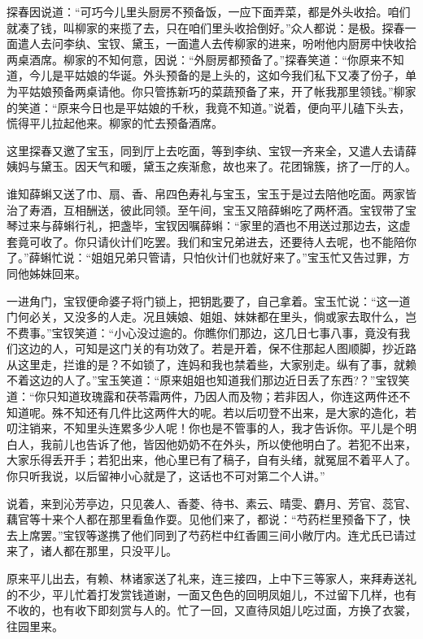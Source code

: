 \documentclass[12pt,oneside]{book}
\begin{document}
探春因说道：“可巧今儿里头厨房不预备饭，一应下面弄菜，都是外头收拾。咱们就凑了钱，叫柳家的来揽了去，只在咱们里头收拾倒好。”众人都说：是极。探春一面遣人去问李纨、宝钗、黛玉，一面遣人去传柳家的进来，吩咐他内厨房中快收拾两桌酒席。柳家的不知何意，因说：“外厨房都预备了。”探春笑道：“你原来不知道，今儿是平姑娘的华诞。外头预备的是上头的，这如今我们私下又凑了份子，单为平姑娘预备两桌请他。你只管拣新巧的菜蔬预备了来，开了帐我那里领钱。”柳家的笑道：“原来今日也是平姑娘的千秋，我竟不知道。”说着，便向平儿磕下头去，慌得平儿拉起他来。柳家的忙去预备酒席。

这里探春又邀了宝玉，同到厅上去吃面，等到李纨、宝钗一齐来全，又遣人去请薛姨妈与黛玉。因天气和暖，黛玉之疾渐愈，故也来了。花团锦簇，挤了一厅的人。

谁知薛蝌又送了巾、扇、香、帛四色寿礼与宝玉，宝玉于是过去陪他吃面。两家皆治了寿酒，互相酬送，彼此同领。至午间，宝玉又陪薛蝌吃了两杯酒。宝钗带了宝琴过来与薛蝌行礼，把盏毕，宝钗因嘱薛蝌：“家里的酒也不用送过那边去，这虚套竟可收了。你只请伙计们吃罢。我们和宝兄弟进去，还要待人去呢，也不能陪你了。”薛蝌忙说：“姐姐兄弟只管请，只怕伙计们也就好来了。”宝玉忙又告过罪，方同他姊妹回来。

一进角门，宝钗便命婆子将门锁上，把钥匙要了，自己拿着。宝玉忙说：“这一道门何必关，又没多的人走。况且姨娘、姐姐、妹妹都在里头，倘或家去取什么，岂不费事。”宝钗笑道：“小心没过逾的。你瞧你们那边，这几日七事八事，竟没有我们这边的人，可知是这门关的有功效了。若是开着，保不住那起人图顺脚，抄近路从这里走，拦谁的是？不如锁了，连妈和我也禁着些，大家别走。纵有了事，就赖不着这边的人了。”宝玉笑道：“原来姐姐也知道我们那边近日丢了东西?？”宝钗笑道：“你只知道玫瑰露和茯苓霜两件，乃因人而及物；若非因人，你连这两件还不知道呢。殊不知还有几件比这两件大的呢。若以后叨登不出来，是大家的造化，若叨注销来，不知里头连累多少人呢！你也是不管事的人，我才告诉你。平儿是个明白人，我前儿也告诉了他，皆因他奶奶不在外头，所以使他明白了。若犯不出来，大家乐得丢开手；若犯出来，他心里已有了稿子，自有头绪，就冤屈不着平人了。你只听我说，以后留神小心就是了，这话也不可对第二个人讲。”

说着，来到沁芳亭边，只见袭人、香菱、待书、素云、晴雯、麝月、芳官、蕊官、藕官等十来个人都在那里看鱼作耍。见他们来了，都说：“芍药栏里预备下了，快去上席罢。”宝钗等遂携了他们同到了芍药栏中红香圃三间小敞厅内。连尤氏已请过来了，诸人都在那里，只没平儿。

原来平儿出去，有赖、林诸家送了礼来，连三接四，上中下三等家人，来拜寿送礼的不少，平儿忙着打发赏钱道谢，一面又色色的回明凤姐儿，不过留下几样，也有不收的，也有收下即刻赏与人的。忙了一回，又直待凤姐儿吃过面，方换了衣裳，往园里来。
\end{document}
